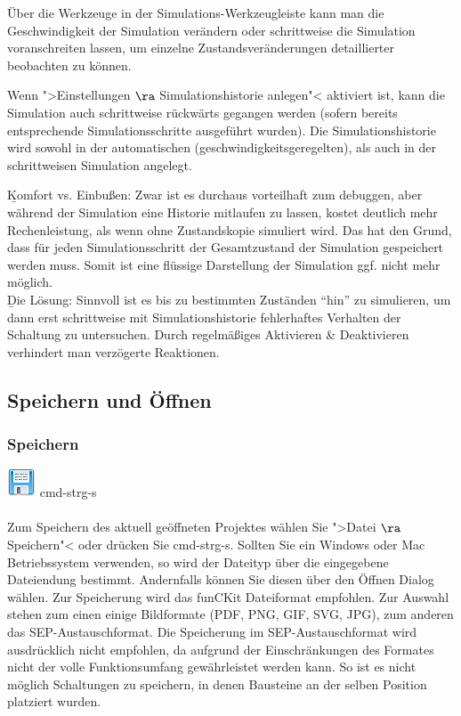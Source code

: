 \documentclass[12pt,a4paper]{scrartcl}
\newcommand{\projectName}{funCKit\xspace} %
\newcommand{\fckOpenDialog}{Öffnen Dialog\xspace}
\newcommand{\fckSEPFormat}{SEP-Austauschformat\xspace}
\begin{document}
Über die Werkzeuge in der Simulations-Werkzeugleiste kann man die Geschwindigkeit der Simulation verändern oder schrittweise die Simulation voranschreiten lassen, um einzelne Zustandsveränderungen detaillierter beobachten zu können.

Wenn ">Einstellungen $\ra$ Simulationshistorie anlegen"< aktiviert ist, kann die Simulation auch schrittweise rückwärts gegangen werden (sofern bereits entsprechende Simulationsschritte ausgeführt wurden). Die Simulationshistorie wird sowohl in der automatischen (geschwindigkeitsgeregelten), als auch in der schrittweisen Simulation angelegt.
\begin{info}
	\b{Komfort vs. Einbußen:} Zwar ist es durchaus vorteilhaft zum debuggen, aber während der Simulation eine Historie mitlaufen zu lassen, kostet deutlich mehr Rechenleistung, als wenn ohne Zustandskopie simuliert wird. Das hat den Grund, dass für jeden Simulationsschritt der Gesamtzustand der Simulation gespeichert werden muss. Somit ist eine flüssige Darstellung der Simulation ggf. nicht mehr möglich. \\
	\b{Die Lösung:} Sinnvoll ist es bis zu bestimmten Zuständen ``hin'' zu simulieren, um dann erst schrittweise mit Simulationshistorie fehlerhaftes Verhalten der Schaltung zu untersuchen. Durch regelmäßiges Aktivieren \& Deaktivieren verhindert man verzögerte Reaktionen.
\end{info}


\subsection{Speichern und Öffnen}
\subsubsection{Speichern}

		{\Large \hspace{0.5em} \includegraphics[height=2ex]{images/disk.png} \hspace{0.5em}\textbullet \hspace{0.5em} \gls{cmd-strg-s} \hspace{0.5em}} \\ \\
Zum Speichern des aktuell geöffneten Projektes wählen Sie ">Datei $\ra$ Speichern"< oder drücken Sie \gls{cmd-strg-s}. Sollten Sie ein Windows oder Mac Betriebssystem verwenden, so wird der Dateityp über die eingegebene Dateiendung bestimmt. Andernfalls können Sie diesen über den \fckOpenDialog wählen. Zur Speicherung wird das \projectName Dateiformat empfohlen. Zur Auswahl stehen zum einen einige Bildformate (PDF, PNG, GIF, SVG, JPG), zum anderen das \fckSEPFormat. Die Speicherung im \fckSEPFormat wird ausdrücklich nicht empfohlen, da aufgrund der Einschränkungen des Formates nicht der volle Funktionsumfang gewährleistet werden kann. So ist es nicht möglich Schaltungen zu speichern, in denen Bausteine an der selben Position platziert wurden.
\end{document}

